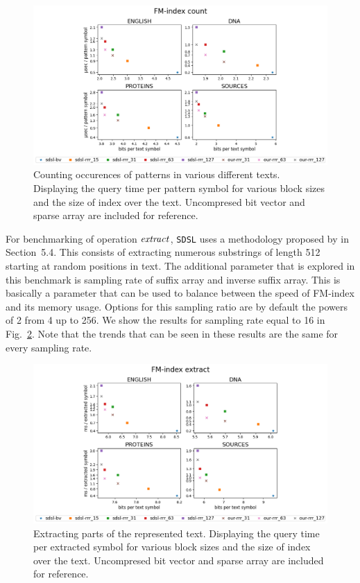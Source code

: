 \begin{figure}
	\centerline{
		\includegraphics[width=\textwidth, height=0.4\textheight]{images/vysledky_sdsl_count}
	}
	\caption[TODO]{Counting occurences of patterns in various different texts. Displaying
	the query time per pattern symbol for various block sizes and the size of index over the
	text. Uncompresed bit vector and sparse array are included for reference. 
	}
	\label{obr:benchmark_sdsl_count}
\end{figure}

For benchmarking of operation $\mathit{extract}$, \texttt{SDSL} uses a methodology proposed by
\cite{ferragina2009compressed} in Section~5.4. This consists of extracting numerous
substrings of length 512 starting at random positions in text. The additional parameter
that is explored in this benchmark is sampling rate of suffix array and inverse suffix array.
This is basically a parameter that can be used to balance between the speed of FM-index and
its memory usage. Options for this sampling ratio are by default the powers of 2 from 4 up to
256. We show the results for sampling rate equal to 16 in Fig.~\ref{obr:benchmark_sdsl_extract}.
Note that the trends that can be seen in these results are the same for every sampling rate.

\begin{figure}
	\centerline{
		\includegraphics[width=\textwidth, height=0.4\textheight]{images/vysledky_sdsl_extract}
	}
	\caption[TODO]{Extracting parts of the represented text. Displaying
	the query time per extracted symbol for various block sizes and the size of index over the
	text. Uncompresed bit vector and sparse array are included for reference. 
	}
	\label{obr:benchmark_sdsl_extract}
\end{figure}

